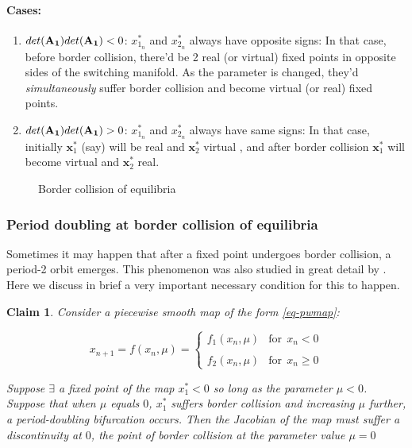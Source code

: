 \documentclass{book}
\renewcommand{\(}{\begin{columns}}
\renewcommand{\)}{\end{columns}}
\newcommand{\<}[1]{\begin{column}{#1}}
\renewcommand{\>}{\end{column}}
\newcommand{\mb}[1]{\mathbf{#1}}
\newcommand{\para}{\paragraph}
\newtheorem{claim}{Claim}[section]
\begin{document}
\para{Cases:\\}
\begin{enumerate}
\item $det({\bf A_1})det({\bf A_1})<0$:  $x^*_{1_n}$ and $x^*_{2_n}$ always have 
opposite signs:  In that case, before border collision, there'd be 2 real (or virtual)
fixed points in opposite sides of the switching manifold. As the parameter is 
changed, they'd \emph{simultaneously} suffer border collision and become 
virtual (or real) fixed points.
\item $det({\bf A_1})det({\bf A_1})>0$:  $x^*_{1_n}$ and $x^*_{2_n}$ always have 
same signs: In that case, initially $\mb{x}_1^*$ (say) will be real and $\mb{x}_2^*$ 
virtual , and after border collision $\mb{x}_1^*$ will become virtual and $\mb{x}_2^*$ 
real.   
\end{enumerate}

\begin{figure}
\centering
\caption{Border collision of equilibria}
\def\svgwidth{0.9\columnwidth}

\end{figure}



\subsubsection{Period doubling at border collision of equilibria}
Sometimes it may happen that after a fixed point undergoes border collision, a 
period-2 orbit emerges.  This phenomenon was also studied in great detail by \cite{feigin-1999}.
Here we discuss in brief a very important necessary condition for this to 
happen.  

\begin{claim}
\label{claim-jacob-disc}
Consider a piecewise smooth map of the form \eqref{eq-pwmap}:

\begin{equation}
x_{n+1}=f(x_n,\mu)=\begin{cases} f_1(x_n,\mu) & \mathrm{for}~~ x_n < 0 \\ \\
f_2(x_n,\mu)&\mathrm{for}~~ x_n\geq 0 \end{cases}
\end{equation}

Suppose $\exists$ a fixed point of the map $x_1^*<0$ so long as  the parameter $\mu<0$.  
Suppose that when $\mu$ equals $0$, $x_1^*$ suffers border collision and 
increasing $\mu$ further, a period-doubling bifurcation occurs.  Then the Jacobian 
of the map must suffer a discontinuity at $0$, the point of border collision 
at the parameter value $\mu=0$
\end{claim}
\end{document}
